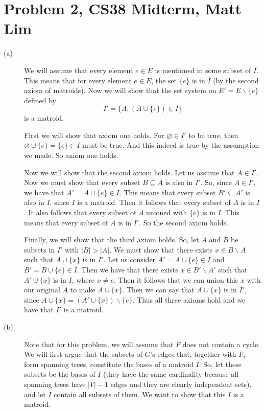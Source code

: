 \documentclass{article}
\begin{document}
\section*{Problem 2, CS38 Midterm, Matt Lim}
\begin{description}
    \item[(a)]
        We will assume that every element $e \in E$ is mentioned in some subset
        of $I$. This means that for every element $e \in E$, the set $\{e\}$
        is in $I$ (by the second axiom of matroids). Now we will show that the set system on
        $E' = E \backslash \{e\}$ defined by
        \[ I' = \{A : (A \cup \{e\}) \in I\} \]
        is a matroid.

        First we will show that axiom one holds. For $\varnothing \in I'$ to be
        true, then $\varnothing \cup \{e\} = \{e\} \in I$ must be true. And this
        indeed is true by the assumption we made. So axiom one holds.

        Now we will show that the second axiom holds. Let us assume that $A \in
        I'$. Now we must show that every subset $B \subseteq A$ is also in $I'$.
        So, since $A \in I'$, we have that $A' = A \cup \{e\} \in I$. This means that
        every subset $B' \subseteq A'$ is also in $I$, since $I$ is a matroid.
        Then it follows that every subset of $A$ is in $I$. It also follows that
        every subset of $A$ unioned with $\{e\}$ is in $I$. This means that
        every subset of $A$ is in $I'$. So the second axiom holds.

        Finally, we will show that the third axiom holds. So, let $A$ and $B$ be
        subsets in $I'$ with $|B| > |A|$. We must show that there exists $x \in
        B \backslash A$ such that $A \cup \{x\}$ is in $I'$. Let us consider
        $A' = A \cup \{e\} \in I$ and $B' = B \cup \{e\} \in I$. Then we have
        that there exists $x \in B' \backslash A'$ such that $A' \cup \{x\}$ is
        in $I$, where $x \neq e$. Then it follows that we can union this $x$
        with our original $A$ to make $A \cup \{x\}$. Then we can say that $A
        \cup \{x\}$ is in $I'$, since $A \cup \{x\} = (A' \cup \{x\}) \backslash
        \{e\}$. Thus all three axioms hold and we have that $I'$ is a matroid.
    \item[(b)]
        Note that for this problem, we will assume that $F$ does not
        contain a cycle. We will first argue that the subsets of $G$'s edges that, together with
        $F$, form spanning trees, constitute the bases of a matroid $I$. So, let
        these subsets be the bases of $I$ (they have the same cardinality
        because all spanning trees have $|V| - 1$ edges and they are clearly
        independent sets), and let $I$ contain all subsets of them. We want to
        show that this $I$ is a matroid.


\end{description}
\end{document}
